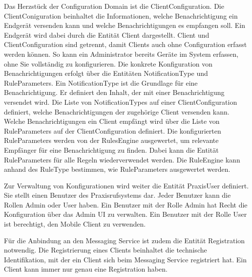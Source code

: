 Das Herzstück der Configuration Domain ist die ClientConfiguration.
Die ClientConiguration beinhaltet die Informationen, welche Benachrichtigung ein Endgerät versenden kann und welche Benachrichtigungen es empfangen soll.
Ein Endgerät wird dabei durch die Entität Client dargestellt.
Client und ClientConfiguration sind getrennt, damit Clients auch ohne Configuration erfasst werden können.
So kann ein Administrator bereits Geräte im System erfassen, ohne Sie vollständig zu konfigurieren.
Die konkrete Konfiguration von Benachrichtigungen erfolgt über die Entitäten NotificationType und RuleParameters.
Ein NotificationType ist die Grundlage für eine Benachrichtigung.
Er definiert den Inhalt, der mit einer Benachrichtigung versendet wird.
Die Liste von NotificationTypes auf einer ClientConfiguration definiert, welche Benachrichtigungen der zugehörige Client versenden kann.
Welche Benachrichtigungen ein Client empfängt wird über die Liste von RuleParameters auf der ClientConfiguration definiert.
Die konfigurierten RuleParameters werden von der RulesEngine ausgewertet, um relevante Empfänger für eine Benachrichtigung zu finden.
Dabei kann die Entität RuleParameters für alle Regeln wiederverwendet werden.
Die RuleEngine kann anhand des RuleType bestimmen, wie RuleParameters ausgewertet werden.

Zur Verwaltung von Konfigurationen wird weiter die Entität PraxisUser definiert.
Sie stellt einen Benutzer des Praxisrufsystems dar.
Jeder Benutzer kann die Rollen Admin oder User haben.
Ein Benutzer mit der Rolle Admin hat Recht die Konfiguration über das Admin UI zu verwalten.
Ein Benutzer mit der Rolle User ist berechtigt, den Mobile Client zu verwenden.

Für die Anbindung an den Messaging Service ist zudem die Entität Registration notwendig.
Die Registrierung eines Clients beinhaltet die technische Identifikation, mit der ein Client sich beim Messaging Service registriert hat.
Ein Client kann immer nur genau eine Registration haben.

\clearpage

